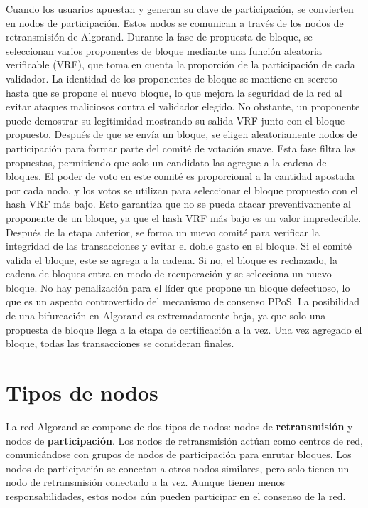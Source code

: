 \documentclass{article}
\begin{document}
Cuando los usuarios apuestan y generan su clave de participación, se convierten en nodos de participación. Estos nodos se comunican a través de los nodos de retransmisión de Algorand. Durante la fase de propuesta de bloque, se seleccionan varios proponentes de bloque mediante una función aleatoria verificable (VRF), que toma en cuenta la proporción de la participación de cada validador. La identidad de los proponentes de bloque se mantiene en secreto hasta que se propone el nuevo bloque, lo que mejora la seguridad de la red al evitar ataques maliciosos contra el validador elegido. No obstante, un proponente puede demostrar su legitimidad mostrando su salida VRF junto con el bloque propuesto.
Después de que se envía un bloque, se eligen aleatoriamente nodos de participación para formar parte del comité de votación suave. Esta fase filtra las propuestas, permitiendo que solo un candidato las agregue a la cadena de bloques. El poder de voto en este comité es proporcional a la cantidad apostada por cada nodo, y los votos se utilizan para seleccionar el bloque propuesto con el hash VRF más bajo. Esto garantiza que no se pueda atacar preventivamente al proponente de un bloque, ya que el hash VRF más bajo es un valor impredecible.
Después de la etapa anterior, se forma un nuevo comité para verificar la integridad de las transacciones y evitar el doble gasto en el bloque. Si el comité valida el bloque, este se agrega a la cadena. Si no, el bloque es rechazado, la cadena de bloques entra en modo de recuperación y se selecciona un nuevo bloque. No hay penalización para el líder que propone un bloque defectuoso, lo que es un aspecto controvertido del mecanismo de consenso PPoS. La posibilidad de una bifurcación en Algorand es extremadamente baja, ya que solo una propuesta de bloque llega a la etapa de certificación a la vez. Una vez agregado el bloque, todas las transacciones se consideran finales.

\section{Tipos de nodos}

La red Algorand se compone de dos tipos de nodos: nodos de \textbf{retransmisión} y nodos de \textbf{participación}. Los nodos de retransmisión actúan como centros de red, comunicándose con grupos de nodos de participación para enrutar bloques. Los nodos de participación se conectan a otros nodos similares, pero solo tienen un nodo de retransmisión conectado a la vez. Aunque tienen menos responsabilidades, estos nodos aún pueden participar en el consenso de la red.
\end{document}
